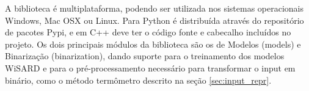A biblioteca é multiplataforma, podendo ser utilizada nos sistemas operacionais Windows, Mac OSX ou Linux. Para Python é distribuída através do repositório de pacotes Pypi, e em C++ deve ter o código fonte e cabecalho incluídos no projeto. Os dois principais módulos da biblioteca são os de Modelos (models) e Binarização (binarization), dando suporte para o treinamento dos modelos WiSARD e para o pré-processamento necessário para transformar o input em binário, como o método termômetro descrito na seção \ref{sec:input_repr}.